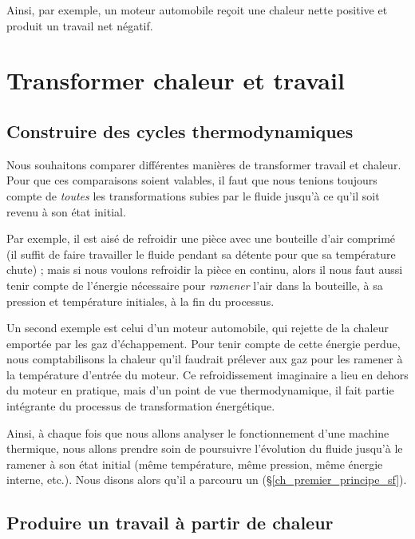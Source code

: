 	Ainsi, par exemple, un moteur automobile reçoit une chaleur nette positive et produit un travail net négatif.
	\onlyframabook{\dontbreakpage}%

\section{Transformer chaleur et travail}

	\subsection{Construire des cycles thermodynamiques}
	\label{ch_construction_cycle}

		Nous souhaitons comparer différentes manières de transformer travail et chaleur. Pour que ces comparaisons soient valables, il faut que nous tenions toujours compte de \emph{toutes} les transformations subies par le fluide jusqu’à ce qu’il soit revenu à son état initial.

		Par exemple, il est aisé de refroidir une pièce avec une bouteille d’air comprimé (il suffit de faire travailler le fluide pendant sa détente pour que sa température chute) ; mais si nous voulons refroidir la pièce en continu, alors il nous faut aussi tenir compte de l’énergie nécessaire pour \emph{ramener} l’air dans la bouteille, à sa pression et température initiales, à la fin du processus.
		
		Un second exemple est celui d’un moteur automobile, qui rejette de la chaleur emportée par les gaz d’échappement. Pour tenir compte de cette énergie perdue, nous comptabilisons la chaleur qu’il faudrait prélever aux gaz pour les ramener à la température d’entrée du moteur. Ce refroidissement imaginaire a lieu en dehors du moteur en pratique, mais d’un point de vue thermodynamique, il fait partie intégrante du processus de transformation énergétique.

		Ainsi, à chaque fois que nous allons analyser le fonctionnement d’une machine thermique, nous allons prendre soin de poursuivre l’évolution du fluide jusqu’à le ramener à son état initial (même température, même pression, même énergie interne, etc.). Nous disons alors qu’il a parcouru un  (\S\ref{ch_premier_principe_sf}).


	\subsection{Produire un travail à partir de chaleur}
	\label{ch_principe_fonctionnement_moteur}

